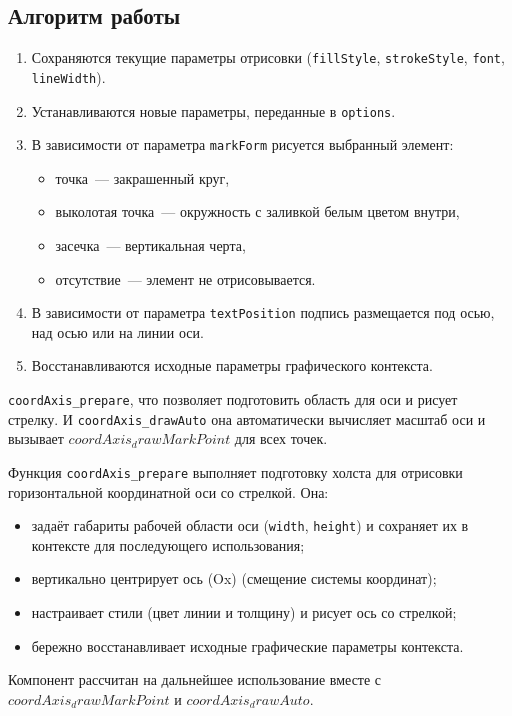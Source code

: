 \subsection{Алгоритм работы}
\begin{enumerate}
    \item Сохраняются текущие параметры отрисовки (\texttt{fillStyle}, \texttt{strokeStyle}, \texttt{font}, \texttt{lineWidth}).
    \item Устанавливаются новые параметры, переданные в \texttt{options}.
    \item В зависимости от параметра \texttt{markForm} рисуется выбранный элемент:
    \begin{itemize}
        \item точка~--- закрашенный круг,
        \item выколотая точка~--- окружность с заливкой белым цветом внутри,
        \item засечка~--- вертикальная черта,
        \item отсутствие~--- элемент не отрисовывается.
    \end{itemize}
    \item В зависимости от параметра \texttt{textPosition} подпись размещается под осью, над осью или на линии оси.
    \item Восстанавливаются исходные параметры графического контекста.
\end{enumerate}

 \texttt{coordAxis\_prepare}, что позволяет подготовить область для оси и рисует стрелку. И
\texttt{coordAxis\_drawAuto} она автоматически вычисляет масштаб оси и вызывает $coordAxis_drawMarkPoint$ для всех точек.


Функция \texttt{coordAxis\_prepare} выполняет подготовку холста для отрисовки горизонтальной координатной оси со стрелкой.
Она:
\begin{itemize}
  \item задаёт габариты рабочей области оси (\verb|width|, \verb|height|) и сохраняет их в контексте для последующего использования;
  \item вертикально центрирует ось (Ox) (смещение системы координат);
  \item настраивает стили (цвет линии и толщину) и рисует ось со стрелкой;
  \item бережно восстанавливает исходные графические параметры контекста.
\end{itemize}
Компонент рассчитан на дальнейшее использование вместе с $coordAxis_drawMarkPoint$ и $coordAxis_drawAuto$.

